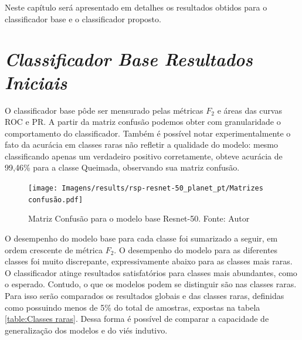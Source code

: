 
Neste capítulo será apresentado em detalhes os resultados obtidos para o classificador base e o classificador proposto.

\section{\textit{Classificador Base Resultados Iniciais}}\label{sec:Cap4_ResultadosPreliminares}


O classificador base pôde ser mensurado pelas métricas $F_2$ e áreas das curvas ROC e PR. A partir da matriz confusão podemos obter com granularidade o comportamento do classificador. Também é possível notar experimentalmente o fato da acurácia em classes raras não refletir a qualidade do modelo: mesmo classificando apenas um verdadeiro positivo corretamente, obteve acurácia de 99,46\% para a classe Queimada, observando sua matriz confusão.

\begin{figure}[!ht]
    \centering
    \texttt{[image: Imagens/results/rsp-resnet-50\_planet\_pt/Matrizes confusão.pdf]}
    \caption{ Matriz Confusão para o modelo base Resnet-50. Fonte: Autor}
    \label{fig:Matriz Confusao Resnet50}
\end{figure} 


O desempenho do modelo base para cada classe foi sumarizado a seguir, em ordem crescente de métrica $F_2$. O desempenho do modelo para as diferentes classes foi muito discrepante, expressivamente abaixo para as classes mais raras. O classificador atinge resultados satisfatórios para classes mais abundantes, como o esperado. Contudo, o que os modelos podem se distinguir são nas classes raras. Para isso serão comparados os resultados globais e das classes raras, definidas como possuindo menos de 5\% do total de amostras, expostas na tabela \ref{table:Classes raras}. Dessa forma é possível de comparar a capacidade de generalização dos modelos e do viés indutivo.

